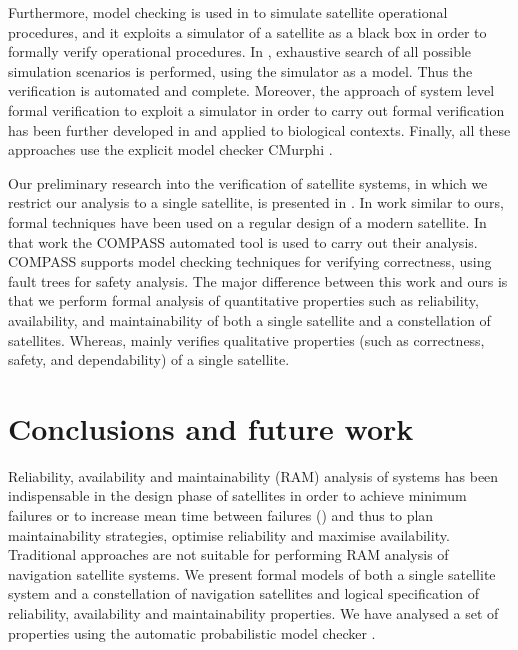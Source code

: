 \documentclass[preprint,12pt]{qrei}
\begin{document}
Furthermore, model checking is used in \cite{CMM+11} to simulate satellite operational procedures, and it exploits a simulator of a satellite as a black box in order to formally verify operational procedures. In \cite{CMM+11, GCM+12}, exhaustive search of all possible simulation scenarios is performed, using the simulator as a model. Thus the verification is automated and complete. Moreover, the approach of system level formal verification to exploit a simulator in order to carry out formal verification has been further developed in \cite{MMM+13,MMM+14} and applied to biological contexts. Finally, all these approaches use the explicit model checker CMurphi \cite{PIM+04}.

Our preliminary research into the verification of satellite systems, in which we restrict our analysis to a single satellite, is presented in \cite{PLM+13}. In work \cite{EKY+12} similar to ours, formal techniques have been used on a regular design of a modern satellite. In that work the COMPASS automated tool is used to carry out their analysis. COMPASS \cite{BCK+11} supports model checking techniques for verifying correctness, using fault trees for safety analysis. The major difference between this work and ours is that we perform formal analysis of quantitative properties such as reliability, availability, and maintainability of both a single satellite and a constellation of satellites. Whereas, \cite{EKY+12} mainly verifies qualitative properties (such as correctness, safety, and dependability) of a single satellite.



\section{Conclusions and future work}
\label{sect:conclusion}

Reliability, availability and maintainability (RAM) analysis of systems has been indispensable in the design phase of satellites in order to achieve minimum failures or to increase mean time between failures () and thus to plan maintainability strategies, optimise reliability and maximise availability. Traditional approaches are not suitable for performing RAM analysis of navigation satellite systems. We present formal models of both a single satellite system and a constellation of navigation satellites and logical specification of reliability, availability and maintainability properties. We have analysed a set of properties using the automatic probabilistic model checker .
\end{document}
